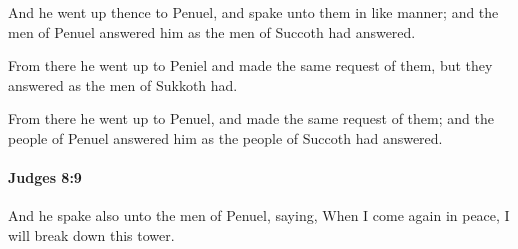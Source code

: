 			\begin{versebox}
					\item[BHS] 
					\item[ASV] And he went up thence to Penuel, and spake unto them in like manner; and the men of Penuel answered him as the men of Succoth had answered.
					\item[NIV] From there he went up to Peniel and made the same request of them, but they answered as the men of Sukkoth had.
					\item[NRSV] From there he went up to Penuel, and made the same request of them; and the people of Penuel answered him as the people of Succoth had answered.
			\end{versebox}

		\paragraph{Judges 8:9} %
			\label{JUDGES-8-9}

			And he spake also unto the men of Penuel, saying, When I come again in peace, I will break down this tower.


